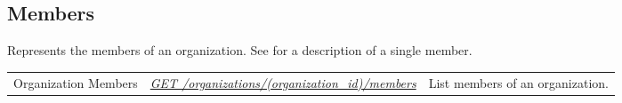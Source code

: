 \documentclass[letterpaper,10pt,english]{sphinxmanual}
\begin{document}
\subsection{Members}
\label{\detokenize{resources/organization:members}}
Represents the members of an organization. See {\hyperref[\detokenize{resources/partner:partner}]{}} for a description of a single member.

\noindent\begin{tabulary}{\linewidth}{|L|L|L|}
\hline
{}\relax &\relax &\relax \\
\hline
Organization Members
&
{\hyperref[\detokenize{resources/organization:get--organizations-(organization_id)-members}]{\emph{GET /organizations/(organization\_id)/members}}}
&
List members of an organization.
\\
\hline\end{tabulary}


\begin{DUlineblock}{0em}
\item[] 
\end{DUlineblock}
\end{document}

